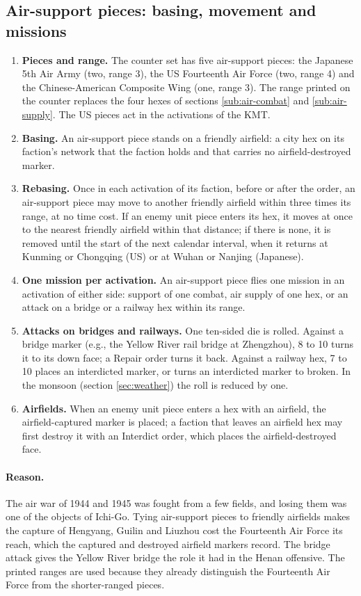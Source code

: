 \documentclass[11pt]{article}
\begin{document}
\subsection{Air-support pieces: basing, movement and missions}\label{app:air}
\draft
\begin{enumerate}
\item \textbf{Pieces and range.} The counter set has five air-support pieces: the Japanese 5th Air Army (two, range 3), the US Fourteenth Air Force (two, range 4) and the Chinese-American Composite Wing (one, range 3). The range printed on the counter replaces the four hexes of sections \ref{sub:air-combat} and \ref{sub:air-supply}. The US pieces act in the activations of the KMT.
\item \textbf{Basing.} An air-support piece stands on a friendly airfield: a city hex on its faction's network that the faction holds and that carries no airfield-destroyed marker.
\item \textbf{Rebasing.} Once in each activation of its faction, before or after the order, an air-support piece may move to another friendly airfield within three times its range, at no time cost. If an enemy unit piece enters its hex, it moves at once to the nearest friendly airfield within that distance; if there is none, it is removed until the start of the next calendar interval, when it returns at Kunming or Chongqing (US) or at Wuhan or Nanjing (Japanese).
\item \textbf{One mission per activation.} An air-support piece flies one mission in an activation of either side: support of one combat, air supply of one hex, or an attack on a bridge or a railway hex within its range.
\item \textbf{Attacks on bridges and railways.} One ten-sided die is rolled. Against a bridge marker (e.g., the Yellow River rail bridge at Zhengzhou), 8 to 10 turns it to its down face; a Repair order turns it back. Against a railway hex, 7 to 10 places an interdicted marker, or turns an interdicted marker to broken. In the monsoon (section \ref{sec:weather}) the roll is reduced by one.
\item \textbf{Airfields.} When an enemy unit piece enters a hex with an airfield, the airfield-captured marker is placed; a faction that leaves an airfield hex may first destroy it with an Interdict order, which places the airfield-destroyed face.
\end{enumerate}
\paragraph{Reason.} The air war of 1944 and 1945 was fought from a few fields, and losing them was one of the objects of Ichi-Go. Tying air-support pieces to friendly airfields makes the capture of Hengyang, Guilin and Liuzhou cost the Fourteenth Air Force its reach, which the captured and destroyed airfield markers record. The bridge attack gives the Yellow River bridge the role it had in the Henan offensive. The printed ranges are used because they already distinguish the Fourteenth Air Force from the shorter-ranged pieces.
\end{document}
